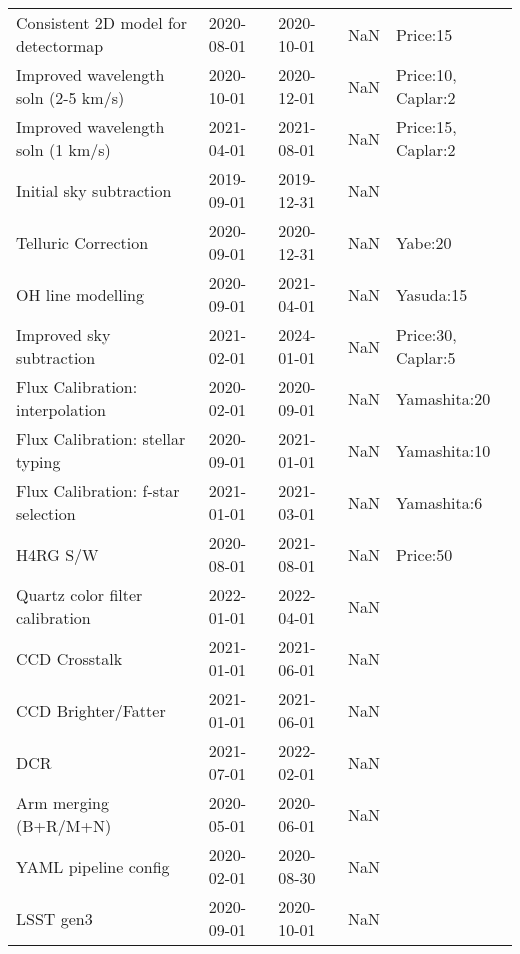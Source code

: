 \begin{longtable}{lllp{2cm}l}
         Consistent 2D model for detectormap &  2020-08-01 &  2020-10-01 &                      NaN &                Price:15 \\
         Improved wavelength soln (2-5 km/s) &  2020-10-01 &  2020-12-01 &                      NaN &      Price:10, Caplar:2 \\
           Improved wavelength soln (1 km/s) &  2021-04-01 &  2021-08-01 &                      NaN &      Price:15, Caplar:2 \\
                     Initial sky subtraction &  2019-09-01 &  2019-12-31 &                      NaN &                         \\
                         Telluric Correction &  2020-09-01 &  2020-12-31 &                      NaN &                 Yabe:20 \\
                           OH line modelling &  2020-09-01 &  2021-04-01 &                      NaN &               Yasuda:15 \\
                    Improved sky subtraction &  2021-02-01 &  2024-01-01 &                      NaN &      Price:30, Caplar:5 \\
             Flux Calibration: interpolation &  2020-02-01 &  2020-09-01 &                      NaN &            Yamashita:20 \\
            Flux Calibration: stellar typing &  2020-09-01 &  2021-01-01 &                      NaN &            Yamashita:10 \\
          Flux Calibration: f-star selection &  2021-01-01 &  2021-03-01 &                      NaN &             Yamashita:6 \\
                                    H4RG S/W &  2020-08-01 &  2021-08-01 &                      NaN &                Price:50 \\
             Quartz color filter calibration &  2022-01-01 &  2022-04-01 &                      NaN &                         \\
                               CCD Crosstalk &  2021-01-01 &  2021-06-01 &                      NaN &                         \\
                         CCD Brighter/Fatter &  2021-01-01 &  2021-06-01 &                      NaN &                         \\
                                         DCR &  2021-07-01 &  2022-02-01 &                      NaN &                         \\
                       Arm merging (B+R/M+N) &  2020-05-01 &  2020-06-01 &                      NaN &                         \\
                        YAML pipeline config &  2020-02-01 &  2020-08-30 &                      NaN &                         \\
                                   LSST gen3 &  2020-09-01 &  2020-10-01 &                      NaN &                         \\
\end{longtable}
